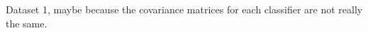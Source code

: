 \begin{answer}
Dataset 1, maybe because the covariance matrices for each classifier are not really the same.
\end{answer}
